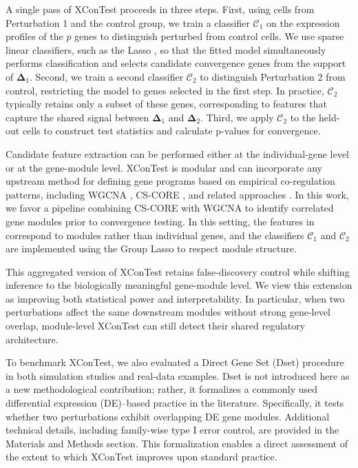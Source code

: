 \documentclass[11pt]{article}
\begin{document}
A single pass of XConTest proceeds in three steps. First, using cells from Perturbation 1 and the control group, we train a classifier $\mathcal{C}_1$ on the expression profiles of the $p$ genes to distinguish perturbed from control cells. We use sparse linear classifiers, such as the Lasso \citep{tibshirani1996regression}, so that the fitted model simultaneously performs classification and selects candidate convergence genes from the support of $\bm{\Delta}_1$. Second, we train a second classifier $\mathcal{C}_2$ to distinguish Perturbation 2 from control, restricting the model to genes selected in the first step. In practice, $\mathcal{C}_2$ typically retains only a subset of these genes, corresponding to features that capture the shared signal between $\bm{\Delta}_1$ and $\bm{\Delta}_2$. Third, we apply $\mathcal{C}_2$ to the held-out cells to construct test statistics and calculate p-values for convergence.

Candidate feature extraction can be performed either at the individual-gene level or at the gene-module level. XConTest is modular and can incorporate any upstream method for defining gene programs based on empirical co-regulation patterns, including WGCNA \citep{langfelder2008wgcna}, CS-CORE \citep{su2023cell}, and related approaches \citep{wang2021constructing,schnitzler2024convergence}. In this work, we favor a pipeline combining CS-CORE with WGCNA to identify correlated gene modules prior to convergence testing. In this setting, the features in  correspond to modules rather than individual genes, and the classifiers $\mathcal{C}_1$ and $\mathcal{C}_2$ are implemented using the Group Lasso \citep{meier2008group} to respect module structure.

This aggregated version of XConTest retains false-discovery control while shifting inference to the biologically meaningful gene-module level. We view this extension as improving both statistical power and interpretability. In particular, when two perturbations affect the same downstream modules without strong gene-level overlap, module-level XConTest can still detect their shared regulatory architecture.

To benchmark XConTest, we also evaluated a Direct Gene Set (Dset) procedure in both simulation studies and real-data examples. Dset is not introduced here as a new methodological contribution; rather, it formalizes a commonly used differential expression (DE)–based practice in the literature. Specifically, it tests whether two perturbations exhibit overlapping DE gene modules. Additional technical details, including family-wise type I error control, are provided in the Materials and Methods section.   This formalization enables a direct assessment of the extent to which XConTest improves upon standard practice.
\end{document}
